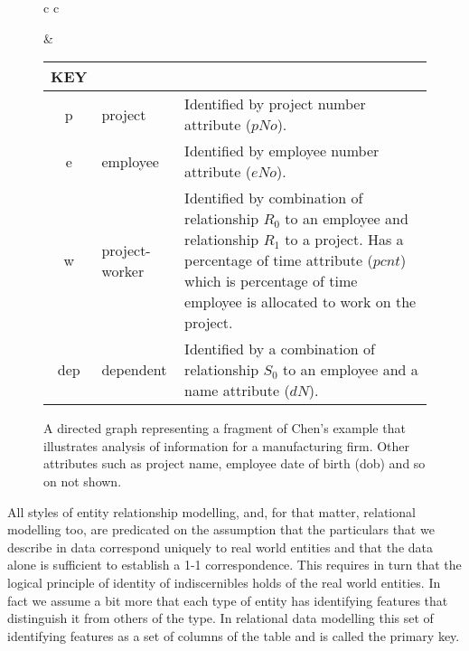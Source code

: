 \documentclass[10pt,a4paper]{article}
\begin{document}
\begin{figure} [h]  %
\begin{center}
\begin{tabular}{c c}
\barsfalse %

& \footnotesize
\begin{tabular}{c p{1.5cm} p{4cm}}
KEY && \\
\hline
p & project & Identified by project number attribute ($pNo$).\\
e & employee & Identified by employee number attribute ($eNo$). \\
w  & project-worker & Identified by combination of relationship $R_0$ to an employee and relationship $R_1$ to a project. Has a percentage of time attribute ($pcnt$) which is percentage of time employee is allocated to work on the project.\\
dep & dependent & Identified by a combination of relationship $S_0$ to an employee and a name attribute ($dN$).\\
\end{tabular} 
\end{tabular}
\end{center}
\caption{A directed graph representing a fragment of Chen's example that illustrates analysis of information for a manufacturing firm. Other attributes such as project name, employee date of birth (dob) and so on not shown.}
\label{chenfragmentSANSbars}
\end{figure}

All styles of entity relationship modelling, and, for that matter, relational modelling too, are 
predicated on the assumption that the particulars that we describe in data 
correspond uniquely to real world entities and that the data 
alone is sufficient to establish a 1-1 correspondence. 
This requires in turn that the logical principle of identity of 
indiscernibles holds of the real world entities. In fact we assume a bit more 
that each type of entity has identifying features that distinguish it from  
others of the type. 
In relational data modelling this set of identifying features as a set of columns of the table and is called the primary key.  
\end{document}
